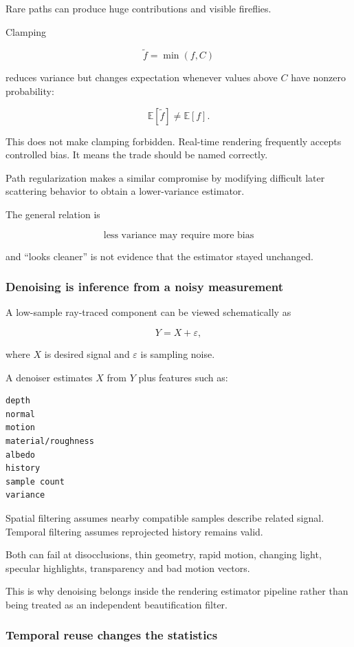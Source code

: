 Rare paths can produce huge contributions and visible fireflies.

Clamping

\[
\widetilde f=\min(f,C)
\]

reduces variance but changes expectation whenever values above \(C\) have nonzero probability:

\[
\mathbb E[\widetilde f]\neq\mathbb E[f].
\]

This does not make clamping forbidden. Real-time rendering frequently accepts controlled bias. It means the trade should be named correctly.

Path regularization makes a similar compromise by modifying difficult later scattering behavior to obtain a lower-variance estimator.

The general relation is

\[
\boxed{
\text{less variance may require more bias}
}
\]

and ``looks cleaner'' is not evidence that the estimator stayed unchanged.

\subsubsection{Denoising is inference from a noisy measurement}\label{03-visual-computing-i-ch001-denoising-is-inference-from-a-noisy-measurement}

A low-sample ray-traced component can be viewed schematically as

\[
Y=X+\varepsilon,
\]

where \(X\) is desired signal and \(\varepsilon\) is sampling noise.

A denoiser estimates \(X\) from \(Y\) plus features such as:

\begin{verbatim}
depth
normal
motion
material/roughness
albedo
history
sample count
variance
\end{verbatim}

Spatial filtering assumes nearby compatible samples describe related signal. Temporal filtering assumes reprojected history remains valid.

Both can fail at disocclusions, thin geometry, rapid motion, changing light, specular highlights, transparency and bad motion vectors.

This is why denoising belongs inside the rendering estimator pipeline rather than being treated as an independent beautification filter.

\subsubsection{Temporal reuse changes the statistics}\label{03-visual-computing-i-ch001-temporal-reuse-changes-the-statistics}

